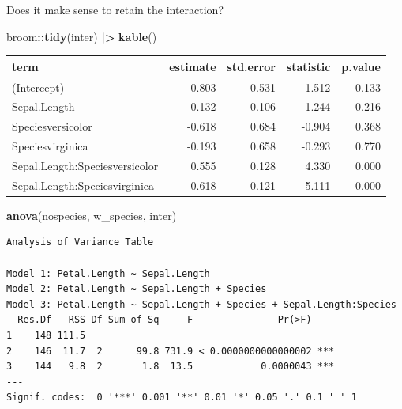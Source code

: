 \documentclass[australian,ignorenonframetext,aspectratio=169]{beamer}
\newenvironment{Shaded}{\begin{snugshade}}{\end{snugshade}}
\newcommand{\ErrorTok}[1]{\textcolor[rgb]{0.64,0.00,0.00}{\textbf{#1}}}
\newcommand{\KeywordTok}[1]{\textcolor[rgb]{0.13,0.29,0.53}{\textbf{#1}}}
\newcommand{\NormalTok}[1]{#1}
\newcommand{\OperatorTok}[1]{\textcolor[rgb]{0.81,0.36,0.00}{\textbf{#1}}}
\newcommand{\StringTok}[1]{\textcolor[rgb]{0.31,0.60,0.02}{#1}}
\begin{document}
\begin{frame}[fragile]{Does it make sense to retain the interaction?}
\protect\hypertarget{does-it-make-sense-to-retain-the-interaction-1}{}

\tiny

\begin{Shaded}
\begin{Highlighting}[]
\NormalTok{broom}\OperatorTok{::}\KeywordTok{tidy}\NormalTok{(inter) }\OperatorTok{|}\ErrorTok{\textgreater{}}\StringTok{ }\KeywordTok{kable}\NormalTok{()}
\end{Highlighting}
\end{Shaded}

\begin{longtable}[]{@{}lrrrr@{}}
\toprule
term & estimate & std.error & statistic & p.value\tabularnewline
\midrule
\endhead
(Intercept) & 0.803 & 0.531 & 1.512 & 0.133\tabularnewline
Sepal.Length & 0.132 & 0.106 & 1.244 & 0.216\tabularnewline
Speciesversicolor & -0.618 & 0.684 & -0.904 & 0.368\tabularnewline
Speciesvirginica & -0.193 & 0.658 & -0.293 & 0.770\tabularnewline
Sepal.Length:Speciesversicolor & 0.555 & 0.128 & 4.330 &
0.000\tabularnewline
Sepal.Length:Speciesvirginica & 0.618 & 0.121 & 5.111 &
0.000\tabularnewline
\bottomrule
\end{longtable}

\begin{Shaded}
\begin{Highlighting}[]
\KeywordTok{anova}\NormalTok{(nospecies, w\_species, inter)}
\end{Highlighting}
\end{Shaded}

\begin{verbatim}
Analysis of Variance Table

Model 1: Petal.Length ~ Sepal.Length
Model 2: Petal.Length ~ Sepal.Length + Species
Model 3: Petal.Length ~ Sepal.Length + Species + Sepal.Length:Species
  Res.Df   RSS Df Sum of Sq     F               Pr(>F)    
1    148 111.5                                            
2    146  11.7  2      99.8 731.9 < 0.0000000000000002 ***
3    144   9.8  2       1.8  13.5            0.0000043 ***
---
Signif. codes:  0 '***' 0.001 '**' 0.01 '*' 0.05 '.' 0.1 ' ' 1
\end{verbatim}

\end{frame}
\end{document}
